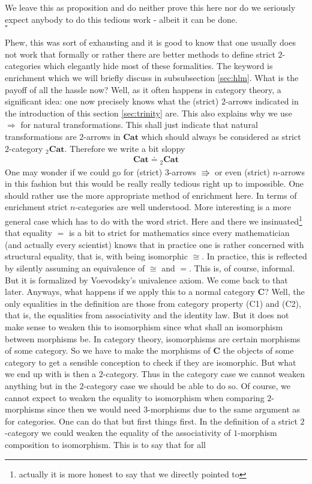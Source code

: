 \begin{prf}
We leave this as proposition and do neither prove this here nor do we seriously expect anybody to do this tedious work - albeit it can be done.
\\
\phantom{proven}
\hfill
$\square$
\end{prf}
Phew, this was sort of exhausting and it is good to know that one usually does not work that formally or rather there are better methods to define strict $2$-categories which elegantly hide most of these formalities. The keyword is {\glqq}enrichment{\grqq} which we will briefly discuss in subsubsection \ref{sec:hlm}. What is the payoff of all the hassle now? Well, as it often happens in category theory, a significant idea: one now precisely knows what the (strict) $2$-arrows indicated in the introduction of this section \ref{sec:trinity} are. This also explains why we use $\Rightarrow$ for natural transformations. This shall just indicate that natural transformations are $2$-arrows in $\mathbf{Cat}$ which should always be considered as strict $2$-category ${}_{2}\mathbf{Cat}$. Therefore we write a bit sloppy
\begin{align*}
  \mathbf{Cat}
  \doteq
  {}_{2}\mathbf{Cat}
\end{align*}
One may wonder if we could go for (strict) $3$-arrows $\Rrightarrow$ or even (strict) $n$-arrows in this fashion but this would be really really tedious right up to impossible. One should rather use the more appropriate method of enrichment here. In terms of enrichment strict $n$-categories are well understood. More interesting is a more general case which has to do with the word {\glqq}strict{\grqq}. Here and there we insinuated\footnote{actually it is more honest to say that we directly pointed to} that equality $=$ is a bit to strict for mathematics since every mathematician (and actually every scientist) knows that in practice one is rather concerned with structural equality, that is, with being isomorphic $\cong$. In practice, this is reflected by silently assuming an equivalence of $\cong$ and $=$. This is, of course, informal. But it is formalized by Voevodsky's {\glqq}univalence axiom{\grqq}. We come back to that later. Anyways, what happens if we apply this to a normal category $\mathbf{C}$? Well, the only equalities in the definition are those from category property (C1) and (C2), that is, the equalities from associativity and the identity law. But it does not make sense to weaken this to isomorphism since what shall an isomorphism between morphisms be. In category theory, isomorphisms are certain morphisms of some category. So we have to make the morphisms of $\mathbf{C}$ the objects of some category to get a sensible conception to check if they are isomorphic. But what we end up with is then a $2$-category. Thus in the category case we cannot weaken anything but in the $2$-category case we should be able to do so. Of course, we cannot expect to weaken the equality to isomorphism when comparing $2$-morphisms since then we would need $3$-morphisms due to the same argument as for categories. One can do that but first things first. In the definition of a strict $2$-category we could weaken the equality of the associativity of $1$-morphism composition to isomorphism. This is to say that for all
